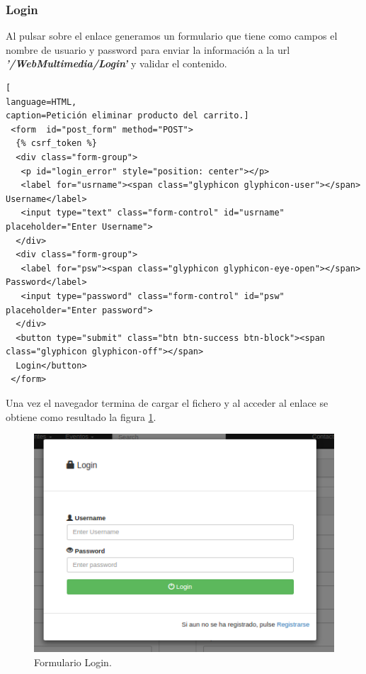 \subsubsection*{Login}
Al pulsar sobre el enlace generamos un formulario que tiene como campos el nombre de usuario y password para enviar la información a la url\textit{\textbf{ '/WebMultimedia/Login'}} y validar el contenido.
\begin{lstlisting}[
language=HTML,
caption=Petición eliminar producto del carrito.]
 <form  id="post_form" method="POST">
  {% csrf_token %}
  <div class="form-group">
   <p id="login_error" style="position: center"></p>
   <label for="usrname"><span class="glyphicon glyphicon-user"></span> Username</label>
   <input type="text" class="form-control" id="usrname" placeholder="Enter Username">
  </div>
  <div class="form-group">
   <label for="psw"><span class="glyphicon glyphicon-eye-open"></span> Password</label>
   <input type="password" class="form-control" id="psw" placeholder="Enter password">
  </div>
  <button type="submit" class="btn btn-success btn-block"><span class="glyphicon glyphicon-off"></span>
  Login</button>
 </form>
\end{lstlisting}
Una vez el navegador termina de cargar el fichero y al acceder al enlace se obtiene como resultado la figura \ref{fig:Form_Login}.
\begin{figure}[!h]
\begin{center}
   \includegraphics[width=0.5\linewidth]{Figures/Login}
	\decoRule
	\caption[Formulario Login]{Formulario Login.}
\label{fig:Form_Login}
\end{center}
\end{figure}
